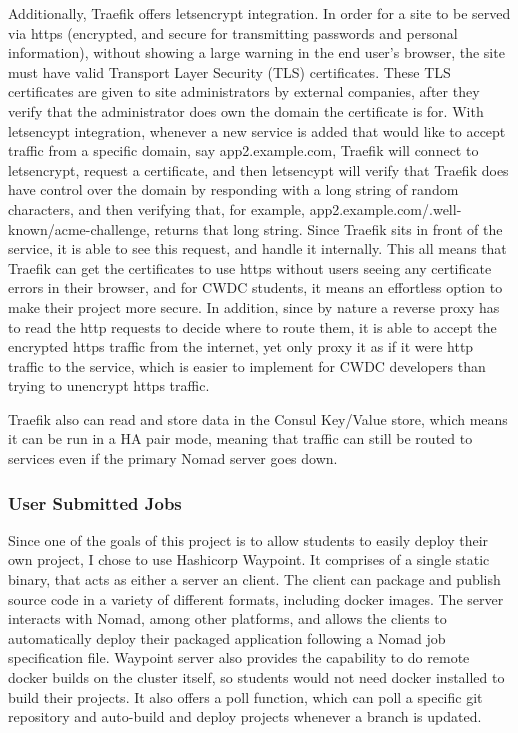 \documentclass{article}
\begin{document}
Additionally, Traefik offers letsencrypt integration. In order for a site to be served via https (encrypted, and secure for transmitting passwords and personal information), without showing a large warning in the end user's browser, the site must have valid  Transport Layer Security (TLS) certificates. These TLS certificates are given to site administrators by external companies, after they verify that the administrator does own the domain the certificate is for. With letsencypt integration, whenever a new service is added that would like to accept traffic from a specific domain, say app2.example.com, Traefik will connect to letsencrypt, request a certificate, and then letsencypt will verify that Traefik does have control over the domain by responding with a long string of random characters, and then verifying that, for example, app2.example.com/.well-known/acme-challenge, returns that long string. Since Traefik sits in front of the service, it is able to see this request, and handle it internally. This all means that Traefik can get the certificates to use https without users seeing any certificate errors in their browser, and for CWDC students, it means an effortless option to make their project more secure. In addition, since by nature a reverse proxy has to read the http requests to decide where to route them, it is able to accept the encrypted https traffic from the internet, yet only proxy it as if it were http traffic to the service, which is easier to implement for CWDC developers than trying to unencrypt https traffic.

Traefik also can read and store data in the Consul Key/Value store, which means it can be run in a HA pair mode, meaning that traffic can still be routed to services even if the primary Nomad server goes down.

\subsubsection{User Submitted Jobs}
Since one of the goals of this project is to allow students to easily deploy their own project, I chose to use Hashicorp Waypoint. It comprises of a single static binary, that acts as either a server an client. The client can package and publish source code in a variety of different formats, including docker images. The server interacts with Nomad, among other platforms, and allows the clients to automatically deploy their packaged application following a Nomad job specification file. Waypoint server also provides the capability to do remote docker builds on the cluster itself, so students would not need docker installed to build their projects. It also offers a poll function, which can poll a specific git repository and auto-build and deploy projects whenever a branch is updated.
\end{document}
